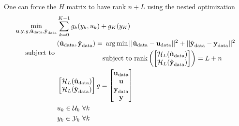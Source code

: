 One can force the $H$ matrix to have rank $n+L$ using the nested optimization
\begin{align}
  \label{eq:deepc-cost-function}
  \min_{\boldsymbol{\mathrm{u}},\boldsymbol{\mathrm{y}},g,\hat{\boldsymbol{\mathrm{u}}}_\textrm{data},\hat{\boldsymbol{\mathrm{y}}}_\textrm{data}} & \sum_{k=0}^{K-1} g_k(y_k,u_k) + g_K(y_K) \\
  \textrm{subject to } &
                         \begin{aligned}
                           (\hat{\boldsymbol{\mathrm{u}}}_\textrm{data},\hat{\boldsymbol{\mathrm{y}}}_\textrm{data}) = &\ \arg \min ||\hat{\boldsymbol{\mathrm{u}}}_\textrm{data} - \boldsymbol{\mathrm{u}}_\textrm{data}||^2 + ||\hat{\boldsymbol{\mathrm{y}}}_\textrm{data} - \boldsymbol{\mathrm{y}}_\textrm{data}||^2 \\
                                                                                 & \textrm{subject to } \textrm{rank} \left(
                                                                                   \begin{bmatrix}
                                                                                     \mathcal{H}_L(\hat{\boldsymbol{\mathrm{u}}}_\textrm{data}) \\
                                                                                     \mathcal{H}_L(\hat{\boldsymbol{\mathrm{y}}}_\textrm{data})
                                                                                   \end{bmatrix}
                                                                                   \right) = L+n
                                                                                   \label{eq:deepc-nested-optimization}
                         \end{aligned} \\
                                                                       & \begin{bmatrix}
                                                                           \mathcal{H}_L(\hat{\boldsymbol{\mathrm{u}}}_\textrm{data}) \\
                                                                           \mathcal{H}_L(\hat{\boldsymbol{\mathrm{y}}}_\textrm{data})
                                                                         \end{bmatrix}g =
                                                                         \begin{bmatrix}
                                                                           \boldsymbol{\mathrm{u}}_\textrm{data} \\ \boldsymbol{\mathrm{u}} \\ \boldsymbol{\mathrm{y}}_\textrm{data} \\ \boldsymbol{\mathrm{y}}
                                                                         \end{bmatrix} \\
                                                                       & \begin{aligned}
                                                                           u_k \in \mathcal{U}_k\ \forall k \\
                                                                           y_k \in \mathcal{Y}_k\ \forall k
                                                                         \end{aligned}
\end{align}
